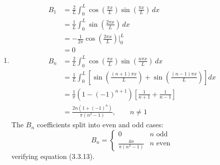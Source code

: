 \documentclass[a4paper]{article}
\begin{document}
\begin{enumerate}[label=(\alph*)]
	\item \begin{align*}
		B_{1} & = \frac{2}{L}\int^{L}_{0} \cos\!\left(\frac{\pi x}{L}\right)\sin\!\left(\frac{\pi x}{L}\right) \, dx \\
		      & = \frac{1}{L}\int^{L}_{0} \sin\!\left(\frac{2\pi x}{L}\right) \, dx \\
      & = -\frac{1}{2\pi}\cos\!\left(\frac{2\pi x}{L}\right)\Big|^{L}_{0} \\
      & = 0 \\
		B_{n} & = \frac{2}{L}\int^{L}_{0} \cos\!\left(\frac{\pi x}{L}\right)\sin\!\left(\frac{n \pi x}{L}\right) \, dx \\
		& = \frac{1}{L}\int^{L}_{0} \left[\sin\!\left(\frac{(n+1) \pi x}{L}\right) + \sin\!\left(\frac{(n-1) \pi x}{L}\right)\right] dx \\
      & = \frac{1}{\pi}\left(1 - (-1)^{n+1}\right)\left[\frac{1}{n+1} + \frac{1}{n-1}\right] \\
      & = \frac{2n\left(1 + (-1)^n\right)}{\pi\left(n^2 - 1\right)}, \qquad n \neq 1
	\end{align*}
	The \( B_{n} \) coefficients split into even and odd cases:
	\[
		B_{n} = \begin{cases}
			0 & n \text{ odd} \\
			\displaystyle{\frac{4n}{\pi \!\left( n^{2} - 1 \right)}} & n \text{ even} 
		\end{cases}
	\]
	verifying equation (3.3.13).


\end{enumerate}
\end{document}
